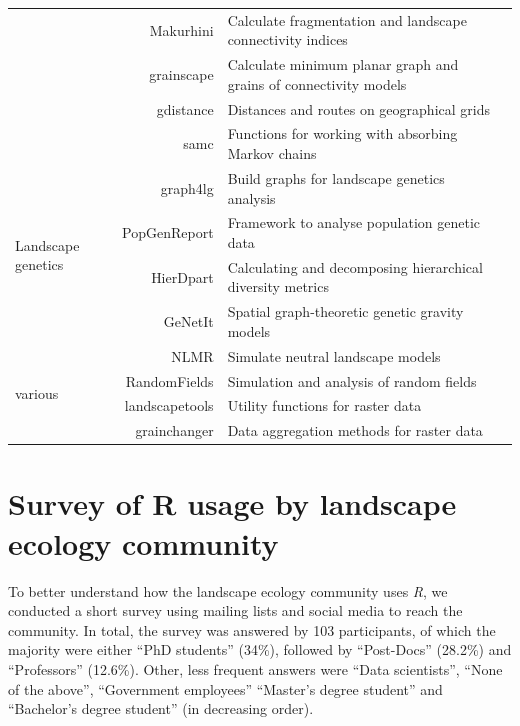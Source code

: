 \documentclass[smallextended]{svjour3}       %
\begin{document}
\begin{table}
\begin{tabularx}{450pt}{lrXr}
& Makurhini & Calculate fragmentation and landscape connectivity indices & \cite{Godinez-Gomez2020} \\
& grainscape & Calculate minimum planar graph and grains of connectivity models & \cite{Chubaty2020} \\
& gdistance & Distances and routes on geographical grids & \cite{vanEtten2017} \\
& samc & Functions for working with absorbing Markov chains & \cite{Marx2020} \\
\hline
\multirow{4}{*}{Landscape genetics} & graph4lg & Build graphs for landscape genetics analysis & \cite{Savary2020} \\
& PopGenReport & Framework to analyse population genetic data & \cite{Adamack2014,Gruber2015} \\
& HierDpart & Calculating and decomposing hierarchical diversity metrics & \cite{Qin2019} \\
& GeNetIt & Spatial graph-theoretic genetic gravity models & \cite{Murphy2010} \\
\hline
\multirow{4}{*}{various} & NLMR & Simulate neutral landscape models & \cite{Sciaini2018} \\
& RandomFields & Simulation and analysis of random fields & \cite{Schlather2015} \\
& landscapetools & Utility functions for raster data & \cite{Sciaini2018}  \\
& grainchanger & Data aggregation methods for raster data & \cite{Graham2019} \\
\hline

\end{tabularx}

\label{tab:packages}

\end{table}

\hypertarget{survey-of-r-usage-by-landscape-ecology-community}{%
\section{Survey of R usage by landscape ecology community}\label{survey-of-r-usage-by-landscape-ecology-community}}

To better understand how the landscape ecology community uses \emph{R}, we conducted a short survey using mailing lists and social media to reach the community.
In total, the survey was answered by 103 participants, of which the majority were either ``PhD students'' (34\%), followed by ``Post-Docs'' (28.2\%) and ``Professors'' (12.6\%).
Other, less frequent answers were ``Data scientists'', ``None of the above'', ``Government employees'' ``Master's degree student'' and ``Bachelor's degree student'' (in decreasing order).
\end{document}
